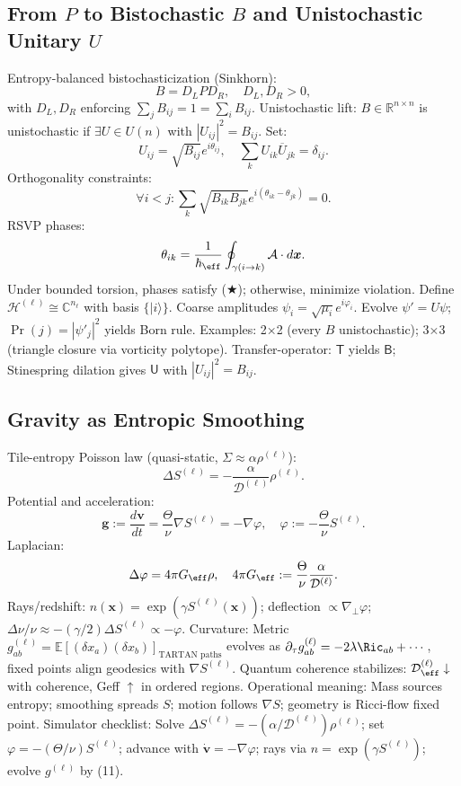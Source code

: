 \documentclass[11pt]{article}
\theoremstyle{plain}
\theoremstyle{definition}
\begin{document}
\subsection{From $P$ to Bistochastic $B$ and Unistochastic Unitary $U$}
Entropy-balanced bistochasticization (Sinkhorn):
\[
B = D_L P D_R, \quad D_L, D_R > 0,
\]
with $D_L, D_R$ enforcing $\sum_j B_{ij} = 1 = \sum_i B_{ij}$.
Unistochastic lift: $B \in \mathbb{R}^{n \times n}$ is unistochastic if $\exists U \in U(n)$ with $|U_{ij}|^2 = B_{ij}$. Set:
\[
U_{ij} = \sqrt{B_{ij}} e^{i \theta_{ij}}, \quad \sum_k U_{ik} \overline{U}_{jk} = \delta_{ij}.
\]
Orthogonality constraints:
\[
\forall i < j: \sum_k \sqrt{B_{ik} B_{jk}} e^{i (\theta_{ik} - \theta_{jk})} = 0. \tag{★}
\]
RSVP phases:
\[
\theta_{ik} = \frac{1}{\hbar_{\eff}} \oint_{\gamma(i \to k)} \mathcal{A} \cdot d\bm{x}.
\]
Under bounded torsion, phases satisfy (★); otherwise, minimize violation.
Define $\mathcal{H}^{(\ell)} \cong \mathbb{C}^{n_\ell}$ with basis $\{|i\rangle\}$. Coarse amplitudes $\psi_i = \sqrt{\mu_i} e^{i \varphi_i}$. Evolve $\psi' = U \psi$; $\Pr(j) = |\psi'_j|^2$ yields Born rule.
Examples: 2×2 (every $B$ unistochastic); 3×3 (triangle closure via vorticity polytope).
Transfer-operator: $\mathsf{T}$ yields $\mathsf{B}$; Stinespring dilation gives $\mathsf{U}$ with $|U_{ij}|^2 = B_{ij}$.
\subsection{Gravity as Entropic Smoothing}
Tile-entropy Poisson law (quasi-static, $\Sigma \approx \alpha \rho^{(\ell)}$):
\[
\Delta S^{(\ell)} = -\frac{\alpha}{\mathcal{D}^{(\ell)}} \rho^{(\ell)}.
\]
Potential and acceleration:
\[
\bm{g} := \frac{d \bm{v}}{dt} = \frac{\Theta}{\nu} \nabla S^{(\ell)} = -\nabla \varphi, \quad \varphi := -\frac{\Theta}{\nu} S^{(\ell)}.
\]
Laplacian:
\[
\Delta \varphi = 4\pi G_{\eff} \rho, \quad 4\pi G_{\eff} := \frac{\Theta}{\nu} \frac{\alpha}{\mathcal{D}^{(\ell)}}.
\]
Rays/redshift: $n(\bm{x}) = \exp(\gamma S^{(\ell)}(\bm{x}))$; deflection $\propto \nabla_\perp \varphi$; $\Delta \nu / \nu \approx -(\gamma / 2) \Delta S^{(\ell)} \propto - \varphi$.
Curvature: Metric $g_{ab}^{(\ell)} = \mathbb{E}[(\delta x_a)(\delta x_b)]_{\text{TARTAN paths}}$ evolves as $\partial_\tau g_{ab}^{(\ell)} = -2\lambda \Ric_{ab} + \cdots$, fixed points align geodesics with $\nabla S^{(\ell)}$.
Quantum coherence stabilizes: $\mathcal{D}^{(\ell)}_{\eff} \downarrow$ with coherence, Geff $\uparrow$ in ordered regions.
Operational meaning: Mass sources entropy; smoothing spreads $S$; motion follows $\nabla S$; geometry is Ricci-flow fixed point.
Simulator checklist: Solve $\Delta S^{(\ell)} = -(\alpha / \mathcal{D}^{(\ell)}) \rho^{(\ell)}$; set $\varphi = -(\Theta / \nu) S^{(\ell)}$; advance with $\dot{\bm{v}} = -\nabla \varphi$; rays via $n = \exp(\gamma S^{(\ell)})$; evolve $g^{(\ell)}$ by (11).
\end{document}
